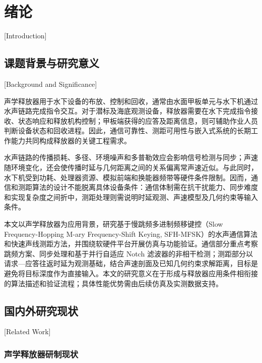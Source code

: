 
\chapter{绪论}[Introduction]
\label{chap01}

\section{课题背景与研究意义}[Background and Significance]

声学释放器用于水下设备的布放、控制和回收，通常由水面甲板单元与水下机通过水声链路完成指令交互。对于潜标及海底观测设备，释放器需要在水下完成指令接收、状态响应和释放机构控制；甲板端获得的应答及距离信息，则可辅助作业人员判断设备状态和回收进程。因此，通信可靠性、测距可用性与嵌入式系统的长期工作能力共同构成释放器的关键工程需求\cite{ohDevelopmentReliableDeep2000,morrisSelectingAcousticRelease2017,halonenDevelopmentLargeScaleTesting2024}。

水声链路的传播损耗、多径、环境噪声和多普勒效应会影响信号检测与同步；声速随环境变化，还会使传播时延与几何距离之间的关系偏离常声速近似。与此同时，水下机受到功耗、处理器资源、模拟前端和换能器频带等硬件条件限制。因而，通信和测距算法的设计不能脱离具体设备条件：通信体制需在抗干扰能力、同步难度和实现复杂度之间折中，测距处理则需说明时延观测、声速模型及几何约束等输入条件\cite{kilfoyleStateArtUnderwater2000,liuProspectsProblemsWireless2008,freitagAnalysisChannelEffects2001,bergerStratificationEffectCompensation2008,sunRelationshipPropagationTime2019}。

本文以声学释放器为应用背景，研究基于慢跳频多进制频移键控（Slow Frequency-Hopping M-ary Frequency-Shift Keying, SFH-MFSK）的水声通信算法和快速声线测距方法，并围绕软硬件平台开展仿真与功能验证。通信部分重点考察跳频方案、同步处理和基于并行自适应 Notch 滤波器的非相干检测；测距部分以请求—应答往返时延为观测基础，结合声速剖面及已知几何约束求解距离，目标是避免将目标深度作为直接输入。本文的研究意义在于形成与释放器应用条件相衔接的算法描述和验证流程；具体性能优势需由后续仿真及实测数据支持。

\section{国内外研究现状}[Related Work]

\subsection{声学释放器研制现状}

